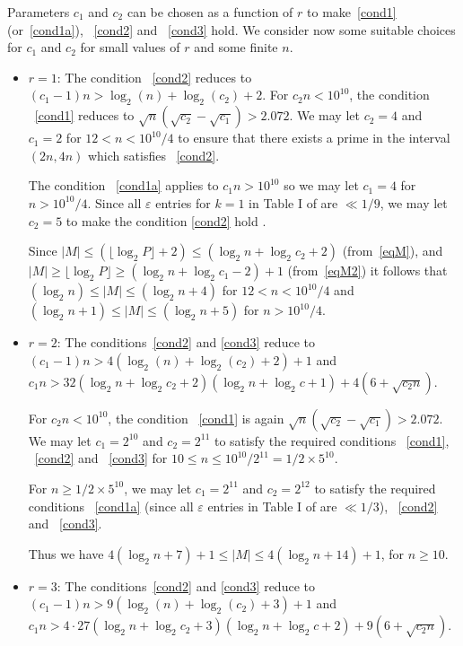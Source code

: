 \documentclass[12pt]{article} \pagestyle{plain} \topmargin
\begin{document}



Parameters $c_1$ and $c_2$ can be chosen as a function of $r$ to
make~\eqref{cond1} (or~\eqref{cond1a}), ~\eqref{cond2} and
~\eqref{cond3} hold. We consider now some suitable choices for $c_1$
and $c_2$ for small values of $r$ and some finite $n$.
\begin{itemize}
\item $r=1$: The condition ~\eqref{cond2} reduces to $(c_1-1)n >
\log_2(n)+\log_2(c_2)+2$. For $c_2n < 10^{10}$, the condition
~\eqref{cond1} reduces to $\sqrt{n}(\sqrt{c_2}-\sqrt{c_1})> 2.072$.
We may let $c_2=4$ and $c_1=2$ for $12<n<10^{10}/4$ to ensure that
there exists a prime in the interval $(2n,4n)$ which satisfies
~\eqref{cond2}.

The condition ~\eqref{cond1a} applies to $c_1n>10^{10}$ so we may
let $c_1=4$
 for $n>10^{10}/4$. Since all $\varepsilon$ entries for $k=1$ in Table I of \cite{rrumely}
 are $\ll 1/9$, we may let $c_2=5$ to make the condition \eqref{cond2} hold .

 Since $|M| \leq (\lfloor\log_2P\rfloor+2)\leq (\log_2 n+\log_2 c_2+2)$ (from~\eqref{eqM}), and
$|M| \geq \lfloor \log_2P\rfloor\geq (\log_2 n+\log_2 c_1-2)+1$
(from~\eqref{eqM2})
 it
 follows that $(\log_2n) \leq |M| \leq (\log_2n+4 )$ for $12<n<10^{10}/4$ and $(\log_2 n+1) \leq |M| \leq (\log_2n+5 )$ for
 $n>10^{10}/4$.
 \item $r=2$: The conditions~\eqref{cond2} and \eqref{cond3} reduce
 to $(c_1-1)n >4(
\log_2(n)+\log_2(c_2)+2)+1$ and $c_1n > 32(\log_2 n+ \log_2
c_2+2)(\log_2n+\log_2 c+1)+4(6+\sqrt{c_2n})$.

For $c_2n < 10^{10}$, the condition ~\eqref{cond1} is again
$\sqrt{n}(\sqrt{c_2}-\sqrt{c_1})> 2.072$. We may let $c_1=2^{10}$
and $c_2=2^{11}$ to satisfy the required conditions ~\eqref{cond1},
~\eqref{cond2} and ~\eqref{cond3} for $10 \leq n\leq
10^{10}/2^{11}=1/2\times 5^{10}$.


For $n \geq 1/2 \times 5^{10}$, we may let $c_1=2^{11}$ and
$c_2=2^{12}$ to satisfy the required conditions ~\eqref{cond1a}
(since all $\varepsilon$ entries in Table I of \cite{rrumely} are
$\ll 1/3$), ~\eqref{cond2} and ~\eqref{cond3}.

Thus we have $4(\log_2n +7)+1 \leq |M| \leq 4(\log_2n+14)+1$, for
$n\geq 10$.

\item
$r=3$: The conditions~\eqref{cond2} and \eqref{cond3} reduce
 to $(c_1-1)n >9(
\log_2(n)+\log_2(c_2)+3)+1$ and $c_1n > 4\cdot27(\log_2 n+ \log_2
c_2+3)(\log_2n+\log_2 c+2)+9(6+\sqrt{c_2n})$.


\end{itemize}
\end{document}
